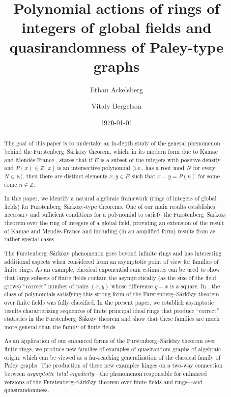 \documentclass{amsart}
\title[Polynomial actions of rings of integers and quasirandomness of Paley-type graphs]{Polynomial actions of rings of integers of global fields and quasirandomness of Paley-type graphs}
\date{\today}
\author{Ethan Ackelsberg}
\author{Vitaly Bergelson}
\theoremstyle{definition}
\numberwithin{equation}{section}
\newcommand{\N}{\mathbb{N}}
\newcommand{\Z}{\mathbb{Z}}
\begin{document}
\maketitle

\begin{abstract}
	The goal of this paper is to undertake an in-depth study of the general phenomenon behind the Furstenberg--S\'{a}rk\"{o}zy theorem, which, in its modern form due to Kamae and Mend\`{e}s-France \cite{km}, states that if $E$ is a subset of the integers with positive density and $P(x) \in \Z[x]$ is an intersective polynomial (i.e., has a root mod $N$ for every $N \in \N$), then there are distinct elements $x, y \in E$ such that $x - y = P(n)$ for some some $n \in \Z$.
    
    In this paper, we identify a natural algebraic framework (rings of integers of global fields) for Furstenberg--S\'{a}rk\"{o}zy-type theorems.
    One of our main results establishes necessary and sufficient conditions for a polynomial to satisfy the Furstenberg--S\'{a}rk\"{o}zy theorem over the ring of integers of a global field, providing an extension of the result of Kamae and Mend\`{e}s-France and including (in an amplified form) results from \cite{br, bl} as rather special cases.

    The Furstenberg--S\'{a}rk\"{o}zy phenomenon goes beyond infinite rings and has interesting additional aspects when considered from an asymptotic point of view for families of finite rings.
    As an example, classical exponential sum estimates can be used to show that large subsets of finite fields contain the asymptotically (as the size of the field grows) ``correct'' number of pairs $(x,y)$ whose difference $y - x$ is a square.
    In \cite{ab_Sarkozy}, the class of polynomials satisfying this strong form of the Furstenberg--S\'{a}rk\"{o}zy theorem over finite fields was fully classified.
    In the present paper, we establish asymptotic results characterizing sequences of finite principal ideal rings that produce ``correct'' statistics in the Furstenberg--S\'{a}k\"{o}zy theorem and show that these families are much more general than the family of finite fields.
    
    As an application of our enhanced forms of the Furstenberg--S\'{a}rk\"{o}zy theorem over finite rings, we produce new families of examples of quasirandom graphs of algebraic origin, which can be viewed as a far-reaching generalization of the classical family of Paley graphs.
    The production of these new examples hinges on a two-way connection between \emph{asymptotic total ergodicity}---the phenomenon responsible for enhanced versions of the Furstenberg--S\'{a}rk\"{o}zy theorem over finite fields and rings---and quasirandomness.
\end{abstract}
\end{document}
